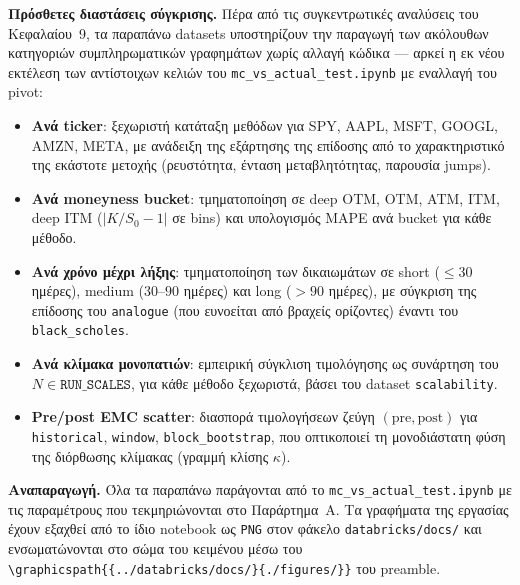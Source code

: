 \documentclass[12pt]{article}
\begin{document}
\noindent\textbf{Πρόσθετες διαστάσεις σύγκρισης.} Πέρα από τις συγκεντρωτικές αναλύσεις του Κεφαλαίου~9, τα παραπάνω datasets υποστηρίζουν την παραγωγή των ακόλουθων κατηγοριών συμπληρωματικών γραφημάτων χωρίς αλλαγή κώδικα — αρκεί η εκ νέου εκτέλεση των αντίστοιχων κελιών του \texttt{mc\_vs\_actual\_test.ipynb} με εναλλαγή του pivot:

\begin{itemize}
  \item \textbf{Ανά ticker}: ξεχωριστή κατάταξη μεθόδων για SPY, AAPL, MSFT, GOOGL, AMZN, META, με ανάδειξη της εξάρτησης της επίδοσης από το χαρακτηριστικό της εκάστοτε μετοχής (ρευστότητα, ένταση μεταβλητότητας, παρουσία jumps).
  \item \textbf{Ανά moneyness bucket}: τμηματοποίηση σε deep OTM, OTM, ATM, ITM, deep ITM ($|K/S_{0}-1|$ σε bins) και υπολογισμός MAPE ανά bucket για κάθε μέθοδο.
  \item \textbf{Ανά χρόνο μέχρι λήξης}: τμηματοποίηση των δικαιωμάτων σε short ($\leq 30$ ημέρες), medium ($30$--$90$ ημέρες) και long ($> 90$ ημέρες), με σύγκριση της επίδοσης του \texttt{analogue} (που ευνοείται από βραχείς ορίζοντες) έναντι του \texttt{black\_scholes}.
  \item \textbf{Ανά κλίμακα μονοπατιών}: εμπειρική σύγκλιση τιμολόγησης ως συνάρτηση του $N \in \texttt{RUN\_SCALES}$, για κάθε μέθοδο ξεχωριστά, βάσει του dataset \texttt{scalability}.
  \item \textbf{Pre/post EMC scatter}: διασπορά τιμολογήσεων ζεύγη $(\text{pre}, \text{post})$ για \texttt{historical}, \texttt{window}, \texttt{block\_bootstrap}, που οπτικοποιεί τη μονοδιάστατη φύση της διόρθωσης κλίμακας (γραμμή κλίσης $\kappa$).
\end{itemize}

\noindent\textbf{Αναπαραγωγή.} Όλα τα παραπάνω παράγονται από το \texttt{mc\_vs\_actual\_test.ipynb} με τις παραμέτρους που τεκμηριώνονται στο Παράρτημα~Α. Τα γραφήματα της εργασίας έχουν εξαχθεί από το ίδιο notebook ως \texttt{PNG} στον φάκελο \texttt{databricks/docs/} και ενσωματώνονται στο σώμα του κειμένου μέσω του \texttt{\textbackslash graphicspath\{\{../databricks/docs/\}\{./figures/\}\}} του preamble.
\end{document}
